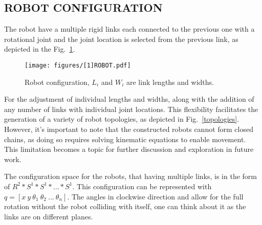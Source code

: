 \documentclass{IEEEtaes}
\newcommand{\algrule}[1][.1pt]{\par\vskip.2\baselineskip\hrule height #1\par\vskip.5\baselineskip}
\begin{document}
\subsection{{\fontsize{11}{10}\selectfont R}OBOT CONFIGURATION}

The robot have a multiple rigid links each connected to the previous one with a rotational joint and the joint location is selected from the previous link, as depicted in the Fig.~\ref{robot}.

\begin{figure}[h!]
    \begin{center}
        \texttt{[image: figures/[1]ROBOT.pdf]}
     \end{center}
     \caption{Robot configuration, $L_i$ and $W_i$ are link lengths and widths.}
     \label{robot}
\end{figure}

For the adjustment of individual lengths and widths, along with the addition of any number of links with individual joint locations. This flexibility facilitates the generation of a variety of robot topologies, as depicted in Fig.~\ref{topologies}. However, it's important to note that the constructed robots cannot form closed chains, as doing so requires solving kinematic equations to enable movement. This limitation becomes a topic for further discussion and exploration in future work.

The configuration space for the robots, that having multiple links, is in the form of $R^2*S^1*S^1*...*S^1$. This configuration can be represented with $q = [ x \ y \ \theta_1 \ \theta_2 \ ... \ \theta_n ]$. The angles in clockwise direction and allow for the full rotation without the robot colliding with itself, one can think about it as the links are on different planes.

\end{document}
